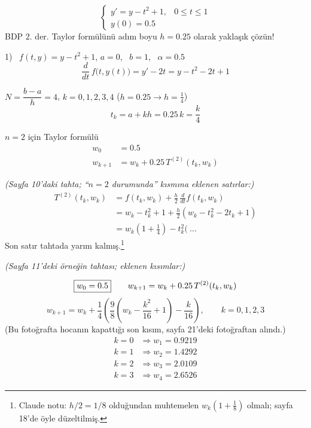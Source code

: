 \documentclass[11pt,a4paper]{article}
\begin{document}
\begin{ornek}
  \[
    \begin{cases}
      y' = y - t^2 + 1, & 0 \le t \le 1 \\
      y(0) = 0.5
    \end{cases}
  \]
  BDP 2. der. Taylor formülünü adım boyu \underline{$h = 0.25$} olarak yaklaşık çözün!
\end{ornek}
\begin{cozum}
  1) \ \underline{$f(t,y) = y - t^2 + 1$}, \quad $a = 0$, \ $b = 1$, \ $\alpha = 0.5$
  \[ \frac{d}{dt}\, f\bigl(t, y(t)\bigr) = y' - 2t = y - t^2 - 2t + 1 \]

  $N = \dfrac{b-a}{h} = 4$, \qquad $k = 0, 1, 2, 3, 4$ \qquad ($h = 0.25 \rightarrow h = \frac{1}{4}$)
  \[ t_k = a + kh = 0.25\,k = \frac{k}{4} \]

  $n = 2$ için Taylor formülü
  \begin{align*}
    w_0 &= 0.5 \\
    w_{k+1} &= w_k + 0.25\,T^{(2)}(t_k, w_k)
  \end{align*}
\end{cozum}

\textit{(Sayfa 10'daki tahta; ``$n = 2$ durumunda'' kısmına eklenen satırlar:)}
\begin{align*}
  T^{(2)}(t_k, w_k) &= f(t_k, w_k) + \frac{h}{2}\,\frac{d}{dt} f(t_k, w_k) \\
  &= w_k - t_k^2 + 1 + \frac{h}{2}\left(w_k - t_k^2 - 2t_k + 1\right) \\
  &= w_k\left(1 + \frac{1}{4}\right) - t_k^2\bigl(\ \dots
\end{align*}
Son satır tahtada yarım kalmış.\footnote{Claude notu: $h/2 = 1/8$ olduğundan muhtemelen
$w_k\left(1 + \frac{1}{8}\right)$ olmalı; sayfa 18'de öyle düzeltilmiş.}

\noindent{}\textit{(Sayfa 11'deki örneğin tahtası; eklenen kısımlar:)}
\begin{cozum}[(devam)]
  \[ \fbox{$w_0 = 0.5$} \qquad w_{k+1} = w_k + 0.25\,T^{(2)}(t_k, w_k) \]
  \[
    w_{k+1} = w_k + \frac{1}{4}\left(\frac{9}{8}\left(w_k - \frac{k^2}{16} + 1\right)
              - \frac{k}{16}\right), \qquad k = 0, 1, 2, 3
  \]
  {\small (Bu fotoğrafta hocanın kapattığı son kısım, sayfa 21'deki fotoğraftan alındı.)}
  \begin{align*}
    k = 0 &\Rightarrow w_1 = 0.9219 \\
    k = 1 &\Rightarrow w_2 = 1.4292 \\
    k = 2 &\Rightarrow w_3 = 2.0109 \\
    k = 3 &\Rightarrow w_4 = 2.6526
  \end{align*}
\end{cozum}
\end{document}

